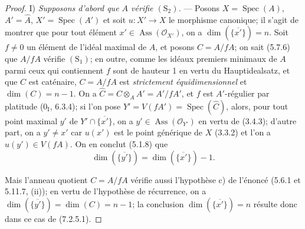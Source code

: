 \begin{proof}
\medskip\noindent
I) \emph{Supposons d'abord que $A$ vérifie $(\mathrm S_2)$.} --- Posons
$X=\operatorname{Spec}(A)$, $A'=\widehat A$,
$X'=\operatorname{Spec}(A')$ et soit $u:X'\to X$ le morphisme canonique;
il s'agit de montrer que pour tout élément
$x'\in\operatorname{Ass}(\mathscr O_{X'})$, on a
$\dim(\overline{\{x'\}})=n$. Soit $f\neq0$ un élément de l'idéal maximal
de $A$, et posons $C=A/fA$; on sait (5.7.6) que $A/fA$ vérifie
$(\mathrm S_1)$; en outre, comme les idéaux premiers minimaux de $A$ parmi
ceux qui contiennent $f$ sont de hauteur 1 en vertu du Hauptidealsatz, et
que $C$ est caténaire, $C=A/fA$ est \emph{strictement équidimensionnel} et
$\dim(C)=n-1$. On a
$\widehat C=C\otimes_AA'=A'/fA'$, et $f$ est $A'$-régulier par platitude
(0$_{\mathrm I}$, 6.3.4); si l'on pose
$Y'=V(fA')=\operatorname{Spec}(\widehat C)$, alors, pour tout point maximal
$y'$ de $Y'\cap\overline{\{x'\}}$, on a
$y'\in\operatorname{Ass}(\mathscr O_{Y'})$ en vertu de (3.4.3); d'autre
part, on a $y'\neq x'$ car $u(x')$ est le point générique de $X$ (3.3.2)
et l'on a $u(y')\in V(fA)$. On en conclut (5.1.8) que
\begin{equation}
\dim(\overline{\{y'\}})=\dim(\overline{\{x'\}})-1.
\tag{7.2.5.1}
\label{IV.2.eq.7.2.5.1-fr}
\end{equation}

Mais l'anneau quotient $C=A/fA$ vérifie aussi l'hypothèse c) de l'énoncé
(5.6.1 et 5.11.7, (ii)); en vertu de l'hypothèse de récurrence, on a
$\dim(\overline{\{y'\}})=\dim(C)=n-1$; la conclusion
$\dim(\overline{\{x'\}})=n$ résulte donc dans ce cas de (7.2.5.1).


\end{proof}

